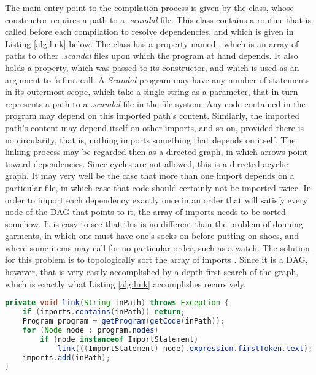 The main entry point to the compilation process is given by the  class, whose constructor requires a path to a \emph{.scandal} file. This class contains a  routine that is called before each compilation to resolve dependencies, and which is given in Listing \ref{alg:link} below. The  class has a property named , which is an array of paths to other \emph{.scandal} files upon which the program at hand depends. It also holds a  property, which was passed to its constructor, and which is used as an argument to 's first call. A \emph{Scandal} program may have any number of  statements in its outermost scope, which take a single string as a parameter, that in turn represents a path to a \emph{.scandal} file in the file system. Any code contained in the program may depend on this imported path's content. Similarly, the imported path's content may depend itself on other imports, and so on, provided there is no circularity, that is, nothing imports something that depends on itself. The linking process may be regarded then as a directed graph, in which arrows point toward dependencies. Since cycles are not allowed, this is a directed acyclic graph. It may very well be the case that more than one import depends on a particular file, in which case that code should certainly not be imported twice. In order to import each dependency exactly once in an order that will satisfy every node of the DAG that points to it, the array of imports needs to be sorted somehow. It is easy to see that this is no different than the problem of donning garments, in which one must have one's socks on before putting on shoes, and where some items may call for no particular order, such as a watch. The solution for this problem is to topologically sort the array of imports \cite[612]{Cormen2009}. Since it is a DAG, however, that is very easily accomplished by a depth-first search of the graph, which is exactly what Listing \ref{alg:link} accomplishes recursively.

\begin{lstlisting}[language=Java,caption={The linking process of a \emph{Scandal} program.},label={alg:link}]
private void link(String inPath) throws Exception {
	if (imports.contains(inPath)) return;
	Program program = getProgram(getCode(inPath));
	for (Node node : program.nodes)
		if (node instanceof ImportStatement)
			link(((ImportStatement) node).expression.firstToken.text);
	imports.add(inPath);
}
\end{lstlisting}

